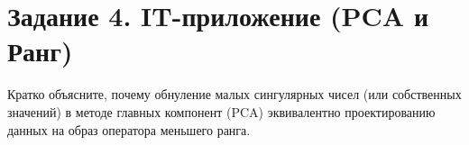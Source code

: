 \documentclass[a4paper,12pt]{article}
\newcommand{\blank}[1][5cm]{\underline{\hspace{#1}}}
\newenvironment{solutionbox}{
    \vspace{0.5em}
    \noindent\begin{tcolorbox}[colback=white!95!gray, colframe=gray!50!white, title=\textbf{Место для решения}, sharp corners]
}{
    \end{tcolorbox}
    \vspace{0.5em}
}
\begin{document}
\section{Задание 4. IT-приложение (PCA и Ранг)}

Кратко объясните, почему обнуление малых сингулярных чисел (или собственных значений) в методе главных компонент (PCA) эквивалентно проектированию данных на образ оператора меньшего ранга.

\begin{solutionbox}
\blank[12cm]
\blank[12cm]
\blank[12cm]
\end{solutionbox}
\end{document}
